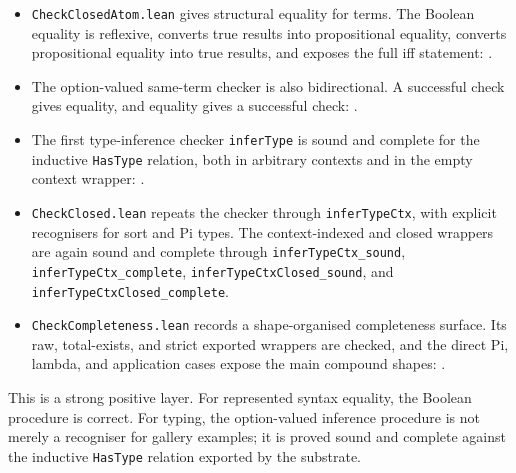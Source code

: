 \begin{itemize}
\item \texttt{CheckClosedAtom.lean} gives structural equality for terms. The
  Boolean equality is reflexive, converts true results into propositional
  equality, converts propositional equality into true results, and exposes the
  full iff statement:
  .
\item The option-valued same-term checker is also bidirectional. A successful
  check gives equality, and equality gives a successful check:
  .
\item The first type-inference checker \texttt{inferType} is sound and
  complete for the inductive \texttt{HasType} relation, both in arbitrary
  contexts and in the empty context wrapper:
  .
\item \texttt{CheckClosed.lean} repeats the checker through
  \texttt{inferTypeCtx}, with explicit recognisers for sort and Pi types. The
  context-indexed and closed wrappers are again sound and complete through
  \texttt{inferTypeCtx\_sound}, \texttt{inferTypeCtx\_complete},
  \texttt{inferTypeCtxClosed\_sound}, and
  \texttt{inferTypeCtxClosed\_complete}.
\item \texttt{CheckCompleteness.lean} records a shape-organised completeness
  surface. Its raw, total-exists, and strict exported wrappers are checked,
  and the direct Pi, lambda, and application cases expose the main compound
  shapes:
  .
\end{itemize}

This is a strong positive layer. For represented syntax equality, the Boolean
procedure is correct. For typing, the option-valued inference procedure is
not merely a recogniser for gallery examples; it is proved sound and complete
against the inductive \texttt{HasType} relation exported by the substrate.


